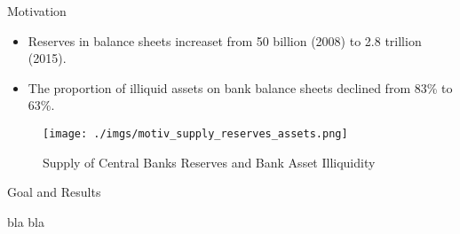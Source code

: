\documentclass[notes,11pt, aspectratio=169]{beamer}
\newenvironment{wideitemize}{\itemize\addtolength{\itemsep}{10pt}}{\enditemize}
\begin{document}


    

    
  
\begin{frame}{Motivation}
    \vspace{0.5cm}
      \begin{itemize}
        \item  Reserves in balance sheets increaset from 50 billion (2008) to 2.8 trillion (2015).
        \item The proportion of illiquid assets on bank balance sheets declined from 83\% to 63\%.
      \end{itemize}
      
        \begin{figure}[t*]
          \centering
    
          \texttt{[image: ./imgs/motiv\_supply\_reserves\_assets.png]}
        \caption{Supply of Central Banks Reserves and Bank Asset Illiquidity}
        \end{figure}
        
      \end{frame}
    
\begin{frame}{Goal and Results}

\begin{wideitemize}
\item bla bla
\end{wideitemize}

    \end{frame}
\end{document}
